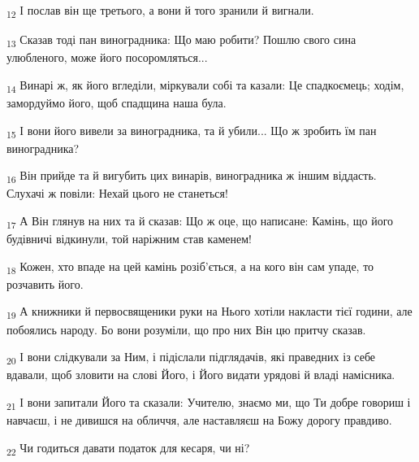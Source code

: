 \begin{tcolorbox}
\textsubscript{12} І послав він ще третього, а вони й того зранили й вигнали.
\end{tcolorbox}
\begin{tcolorbox}
\textsubscript{13} Сказав тоді пан виноградника: Що маю робити? Пошлю свого сина улюбленого, може його посоромляться...
\end{tcolorbox}
\begin{tcolorbox}
\textsubscript{14} Винарі ж, як його вгледіли, міркували собі та казали: Це спадкоємець; ходім, замордуймо його, щоб спадщина наша була.
\end{tcolorbox}
\begin{tcolorbox}
\textsubscript{15} І вони його вивели за виноградника, та й убили... Що ж зробить їм пан виноградника?
\end{tcolorbox}
\begin{tcolorbox}
\textsubscript{16} Він прийде та й вигубить цих винарів, виноградника ж іншим віддасть. Слухачі ж повіли: Нехай цього не станеться!
\end{tcolorbox}
\begin{tcolorbox}
\textsubscript{17} А Він глянув на них та й сказав: Що ж оце, що написане: Камінь, що його будівничі відкинули, той наріжним став каменем!
\end{tcolorbox}
\begin{tcolorbox}
\textsubscript{18} Кожен, хто впаде на цей камінь розіб'ється, а на кого він сам упаде, то розчавить його.
\end{tcolorbox}
\begin{tcolorbox}
\textsubscript{19} А книжники й первосвященики руки на Нього хотіли накласти тієї години, але побоялись народу. Бо вони розуміли, що про них Він цю притчу сказав.
\end{tcolorbox}
\begin{tcolorbox}
\textsubscript{20} І вони слідкували за Ним, і підіслали підглядачів, які праведних із себе вдавали, щоб зловити на слові Його, і Його видати урядові й владі намісника.
\end{tcolorbox}
\begin{tcolorbox}
\textsubscript{21} І вони запитали Його та сказали: Учителю, знаємо ми, що Ти добре говориш і навчаєш, і не дивишся на обличчя, але наставляєш на Божу дорогу правдиво.
\end{tcolorbox}
\begin{tcolorbox}
\textsubscript{22} Чи годиться давати податок для кесаря, чи ні?
\end{tcolorbox}
